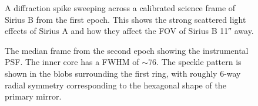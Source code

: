 \documentclass[twocolumn,linenumbers]{aastex631}
\begin{document}

\begin{figure}
    \centering
    \caption{A diffraction spike sweeping across a calibrated science frame of Sirius B from the first epoch. This shows the strong scattered light effects of Sirius A and how they affect the FOV of Sirius B \ang{;;11} away.}
    \label{fig:spike}
\end{figure}

\begin{figure}
    \centering
    \caption{The median frame from the second epoch showing the instrumental PSF. The inner core has a FWHM of $\sim$\qty{76}{\milliarcsecond}. The speckle pattern is shown in the blobs surrounding the first ring, with roughly 6-way radial symmetry corresponding to the hexagonal shape of the primary mirror.}
    \label{fig:psf}
\end{figure}
\end{document}
